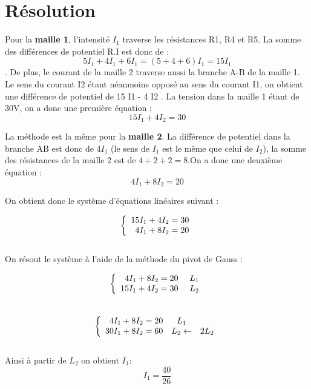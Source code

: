 \documentclass[a4paper,12pt]{report}
\begin{document}
\section{Résolution}

Pour la \textbf{maille 1}, l’intensité $I_{1}$ traverse les résistances R1, R4 et R5. La somme des différences de potentiel R.I est donc de :
\[5I_{1} + 4I_{1} + 6I_{1}= (5+4+6)I_{1} = 15 I_{1}\].
De plus, le courant de la maille 2 traverse aussi la branche A-B de la maille 1. Le sens du courant I2 étant néanmoins opposé au sens du courant I1, on obtient une différence de potentiel de 15 I1 - 4 I2 . La tension dans la maille 1 étant de 30V, on a donc une première équation : 
\begin{equation}
15I_{1}+4I_{2} = 30
\end{equation}        

La méthode est la même pour la \textbf{maille 2}. La différence de potentiel dans la branche AB est donc de 4$I_{1}$ (le sens de $I_{1}$ est le même que celui de $I_{2}$), la somme des résistances de la maille 2 est de $4+2+2=8$.On a donc une deuxième équation :
\begin{equation}
4I_{1}+8I_{2}=20
\end{equation}

On obtient donc le système d'équations linéaires suivant :

\[
\left\{
\begin{array}{r c c l}
15I_{1}+4I_{2} = 30\\
4I_{1}+8I_{2}=20\\
\end{array}
\right.
\]\\


On résout le système à l'aide de la méthode du pivot de Gauss :

\[
\left\{
\begin{array}{r c c l}
4I_{1}+8I_{2}=20\ &  L_1\\
15I_{1}+4I_{2} = 30\ & L_2\\
\end{array}
\right.
\]\\

\[
\left\{
\begin{array}{r c c l}
4I_{1}+8I_{2}=20 & L_1\\
30I_{1}+8I_{2} = 60 & L_2 \leftarrow & 2L_2\\
\end{array}
\right.
\]\\


Ainsi à partir de $L_2$ on obtient $I_{1}$:
$$I_{1}=\frac{40}{26}$$
\end{document}
